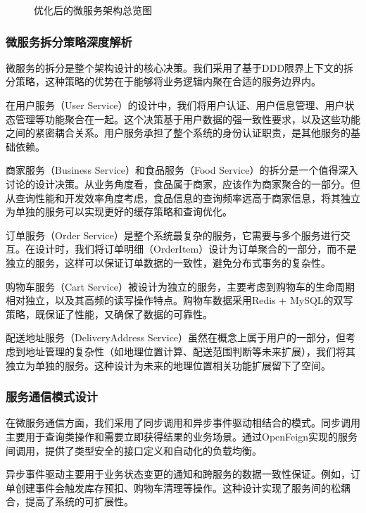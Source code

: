 \documentclass[a4paper,12pt]{article}
\begin{document}
\begin{figure}[H]
\begin{tikzpicture}[scale=1.0, every node/.style={font=\footnotesize}]
\end{tikzpicture}
\caption{优化后的微服务架构总览图}
\label{fig:microservice-architecture-overview}
\end{figure}

\subsubsection{微服务拆分策略深度解析}

微服务的拆分是整个架构设计的核心决策。我们采用了基于DDD限界上下文的拆分策略，这种策略的优势在于能够将业务逻辑内聚在合适的服务边界内。

在用户服务（User Service）的设计中，我们将用户认证、用户信息管理、用户状态管理等功能聚合在一起。这个决策基于用户数据的强一致性要求，以及这些功能之间的紧密耦合关系。用户服务承担了整个系统的身份认证职责，是其他服务的基础依赖。

商家服务（Business Service）和食品服务（Food Service）的拆分是一个值得深入讨论的设计决策。从业务角度看，食品属于商家，应该作为商家聚合的一部分。但从查询性能和开发效率角度考虑，食品信息的查询频率远高于商家信息，将其独立为单独的服务可以实现更好的缓存策略和查询优化。

订单服务（Order Service）是整个系统最复杂的服务，它需要与多个服务进行交互。在设计时，我们将订单明细（OrderItem）设计为订单聚合的一部分，而不是独立的服务，这样可以保证订单数据的一致性，避免分布式事务的复杂性。

购物车服务（Cart Service）被设计为独立的服务，主要考虑到购物车的生命周期相对独立，以及其高频的读写操作特点。购物车数据采用Redis + MySQL的双写策略，既保证了性能，又确保了数据的可靠性。

配送地址服务（DeliveryAddress Service）虽然在概念上属于用户的一部分，但考虑到地址管理的复杂性（如地理位置计算、配送范围判断等未来扩展），我们将其独立为单独的服务。这种设计为未来的地理位置相关功能扩展留下了空间。

\subsubsection{服务通信模式设计}

在微服务通信方面，我们采用了同步调用和异步事件驱动相结合的模式。同步调用主要用于查询类操作和需要立即获得结果的业务场景。通过OpenFeign实现的服务间调用，提供了类型安全的接口定义和自动化的负载均衡。

异步事件驱动主要用于业务状态变更的通知和跨服务的数据一致性保证。例如，订单创建事件会触发库存预扣、购物车清理等操作。这种设计实现了服务间的松耦合，提高了系统的可扩展性。
\end{document}
